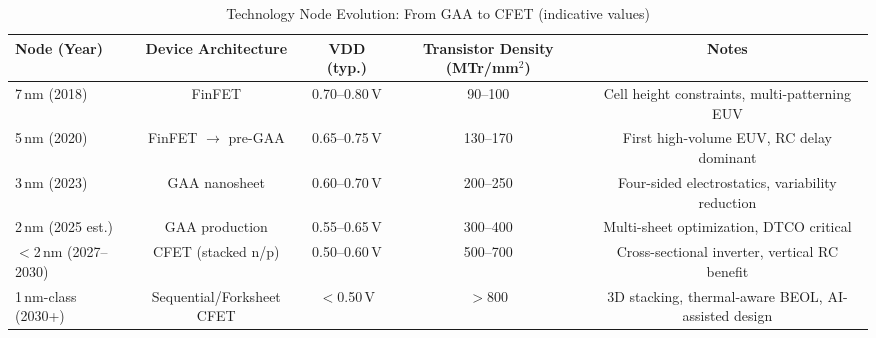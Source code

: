\documentclass[conference]{IEEEtran}
\begin{document}
\begin{table*}[t]
\centering
\caption{Technology Node Evolution: From GAA to CFET (indicative values)}
\label{tab:node_scaling}
\begin{tabular}{lcccc}
\hline
\textbf{Node (Year)} & \textbf{Device Architecture} & \textbf{VDD (typ.)} & \textbf{Transistor Density (MTr/mm$^2$)} & \textbf{Notes} \\
\hline
7\,nm (2018)  & FinFET              & 0.70--0.80\,V & 90--100   & Cell height constraints, multi-patterning EUV \\
5\,nm (2020)  & FinFET $\rightarrow$ pre-GAA & 0.65--0.75\,V & 130--170  & First high-volume EUV, RC delay dominant \\
3\,nm (2023)  & GAA nanosheet       & 0.60--0.70\,V & 200--250  & Four-sided electrostatics, variability reduction \\
2\,nm (2025 est.) & GAA production   & 0.55--0.65\,V & 300--400  & Multi-sheet optimization, DTCO critical \\
$<$2\,nm (2027--2030) & CFET (stacked n/p) & 0.50--0.60\,V & 500--700  & Cross-sectional inverter, vertical RC benefit \\
1\,nm-class (2030+) & Sequential/Forksheet CFET & $<$0.50\,V & $>$800 & 3D stacking, thermal-aware BEOL, AI-assisted design \\
\hline
\end{tabular}
\end{table*}
\end{document}
